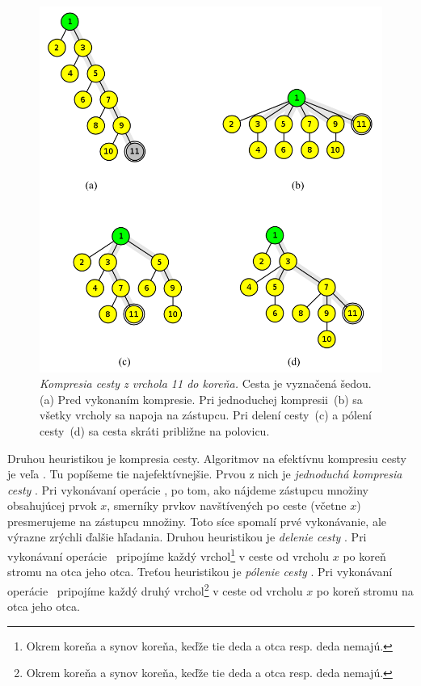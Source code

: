 \begin{figure}
\includegraphics[width=\columnwidth]{obrazky/komp.png}
\caption{\emph{Kompresia cesty z vrchola 11 do koreňa.} 
Cesta je vyznačená šedou. 
(a) Pred vykonaním kompresie. Pri jednoduchej 
kompresii~(b) sa všetky vrcholy sa napoja na zástupcu. Pri delení cesty~(c) a 
pólení cesty~(d) sa cesta skráti približne na polovicu.} 
\label{img:komp} 
\end{figure}

Druhou heuristikou je kompresia cesty. Algoritmov na efektívnu kompresiu 
cesty je veľa \citep{paths2}. Tu popíšeme tie najefektívnejšie. Prvou z nich 
je \emph{jednoduchá kompresia cesty} \citep{comp1}. Pri vykonávaní 
operácie \find, po tom, 
ako nájdeme zástupcu množiny obsahujúcej prvok $x$, smerníky prvkov 
navštívených po ceste (včetne $x$) presmerujeme na zástupcu množiny. Toto 
síce spomalí prvé vykonávanie, ale výrazne zrýchli ďalšie hľadania. 
Druhou heuristikou je \emph{delenie cesty} \citep{comp2}. Pri vykonávaní 
operácie \find\ 
pripojíme každý vrchol\footnote{Okrem koreňa a synov koreňa, 
keďže tie deda a otca resp. deda nemajú.} v ceste od vrcholu $x$ po koreň stromu 
na otca jeho otca. 
Treťou heuristikou je \emph{pólenie cesty} \citep{comp2}. Pri vykonávaní 
operácie \find\ 
pripojíme každý druhý vrchol\footnote{Okrem koreňa a synov koreňa, 
keďže tie deda a otca resp. deda nemajú.} 
v ceste od vrcholu $x$ po koreň stromu na otca jeho otca. 

